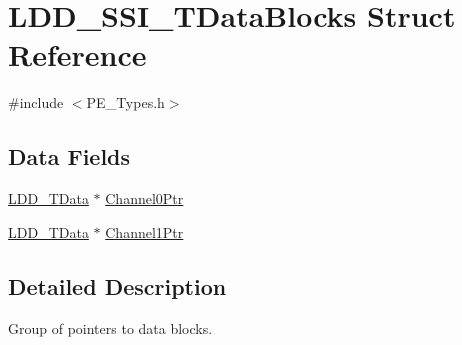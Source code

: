 \hypertarget{struct_l_d_d___s_s_i___t_data_blocks}{\section{L\-D\-D\-\_\-\-S\-S\-I\-\_\-\-T\-Data\-Blocks Struct Reference}
\label{struct_l_d_d___s_s_i___t_data_blocks}
}


{\ttfamily \#include $<$P\-E\-\_\-\-Types.\-h$>$}

\subsection*{Data Fields}
\begin{DoxyCompactItemize}
\item 
\hyperlink{group___p_e___types__module_gade8ef9401405bd941b6da738b807f980}{L\-D\-D\-\_\-\-T\-Data} $\ast$ \hyperlink{struct_l_d_d___s_s_i___t_data_blocks_a8b1b9f1fd6075f9d9975f1506ac64a16}{Channel0\-Ptr}
\item 
\hyperlink{group___p_e___types__module_gade8ef9401405bd941b6da738b807f980}{L\-D\-D\-\_\-\-T\-Data} $\ast$ \hyperlink{struct_l_d_d___s_s_i___t_data_blocks_a5c0e65fe82f88a245123217769316fef}{Channel1\-Ptr}
\end{DoxyCompactItemize}


\subsection{Detailed Description}
Group of pointers to data blocks. 


